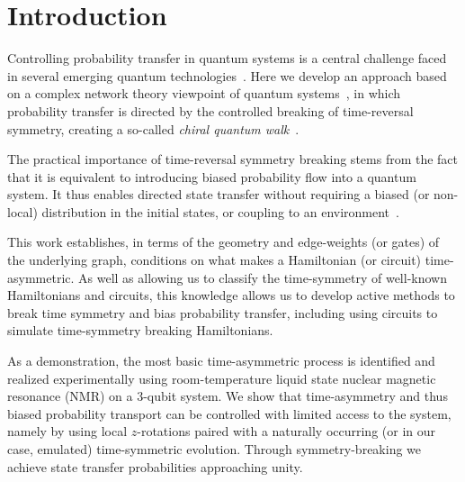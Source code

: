 \documentclass[aps,prx,10pt,
               superscriptaddress,
               twocolumn,
               longbibliography,
showpacs]{revtex4-1}
\theoremstyle{plain}
\theoremstyle{definition}
\begin{document}
\maketitle

\section{Introduction}
Controlling probability transfer in
quantum systems is a central challenge faced in several emerging
quantum technologies~\cite{jones1998implementation, vandersypen2001experimental,
Lanyon2010towards, zhang2012digital, nv_opt2013}.
Here we develop an approach based on a complex
network theory viewpoint of quantum
systems~\cite{PhysRevX.3.041007,mulken2011ctqw,childs2009universal,Perseguers2010},
in which probability transfer is directed by the controlled breaking of
time-reversal symmetry, creating a so-called {\it chiral quantum
walk}~\cite{Z13,xiang2013transfer,bedkihal2013transfer,manzano2013transfer,
cameron2013transfer}.

The practical importance of time-reversal symmetry breaking stems from the fact
that it is equivalent to introducing
biased probability flow into a quantum system. It thus enables directed state transfer 
without requiring a
biased (or non-local) distribution in the initial states, or coupling to an
environment~\cite{Z13,plenio2008dephasing, 2012PhRvL.108b0602S, Bose07}.



This work establishes, in terms of the geometry and edge-weights (or gates) of
the underlying graph, conditions on what makes a Hamiltonian (or circuit)
time-asymmetric. As well as allowing us to classify the time-symmetry of well-known Hamiltonians and circuits,
this knowledge allows us to develop active methods to break time symmetry and bias probability transfer, including
using circuits to simulate time-symmetry breaking Hamiltonians.

As a demonstration, the most basic time-asymmetric process is identified and realized
experimentally using room-temperature liquid state nuclear magnetic resonance
(NMR) on a $3$-qubit system.
We show that time-asymmetry and thus biased 
probability transport can be
controlled with limited access to the system, namely by using local
$z$-rotations paired with a naturally occurring (or in our case, emulated)
time-symmetric evolution. Through symmetry-breaking we achieve state transfer
probabilities approaching unity.
\end{document}
